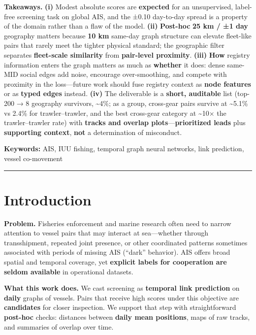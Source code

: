 \documentclass[
]{article}
\begin{document}
\textbf{Takeaways.} \textbf{(i)} Modest absolute scores are
\textbf{expected} for an unsupervised, label-free screening task on
global AIS, and the ±0.10 day-to-day spread is a property of the domain
rather than a flaw of the model. \textbf{(ii)} \textbf{Post-hoc}
\textbf{25 km / ±1 day} geography matters because \textbf{10 km}
same-day graph structure can elevate fleet-like pairs that rarely meet
the tighter physical standard; the geographic filter separates
\textbf{fleet-scale similarity} from \textbf{pair-level proximity}.
\textbf{(iii)} \textbf{How} registry information enters the graph
matters as much as \textbf{whether} it does: dense same-MID social edges
add noise, encourage over-smoothing, and compete with proximity in the
loss---future work should fuse registry context as \textbf{node
features} or as \textbf{typed edges} instead. \textbf{(iv)} The
deliverable is a \textbf{short, auditable} list (top-200 → 8 geography
survivors, \textasciitilde4\%; as a group, cross-gear pairs survive at
\textasciitilde5.1\% vs 2.4\% for trawler--trawler, and the best
cross-gear category at \textasciitilde10× the trawler--trawler rate)
with \textbf{tracks and overlap plots}---\textbf{prioritized leads} plus
\textbf{supporting context}, \textbf{not} a determination of misconduct.

\textbf{Keywords:} AIS, IUU fishing, temporal graph neural networks,
link prediction, vessel co-movement

\begin{center}\rule{0.5\linewidth}{0.5pt}\end{center}

\section{Introduction}\label{introduction}

\textbf{Problem.} Fisheries enforcement and marine research often need
to narrow attention to vessel pairs that may interact at sea---whether
through transshipment, repeated joint presence, or other coordinated
patterns sometimes associated with periods of missing AIS (``dark''
behavior). AIS offers broad spatial and temporal coverage, yet
\textbf{explicit labels for cooperation are seldom available} in
operational datasets.

\textbf{What this work does.} We cast screening as \textbf{temporal link
prediction} on \textbf{daily} graphs of vessels. Pairs that receive high
scores under this objective are \textbf{candidates} for closer
inspection. We support that step with straightforward \textbf{post-hoc}
checks: distances between \textbf{daily mean positions}, maps of raw
tracks, and summaries of overlap over time.
\end{document}
